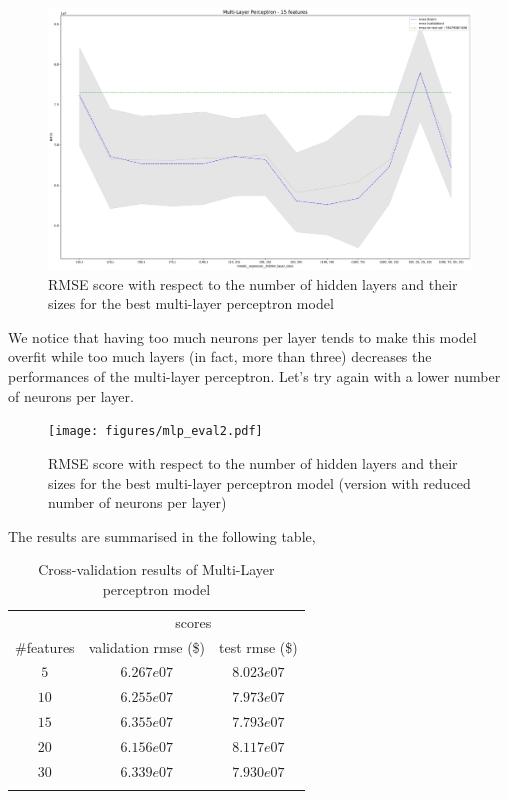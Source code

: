 \begin{figure}[H]
	\centering
	\includegraphics{figures/mlp_eval1.pdf}
	\caption{RMSE score with respect to the number of hidden layers and their sizes for the best multi-layer perceptron model}
	\label{fig:mlp_eval1}
\end{figure}

We notice that having too much neurons per layer tends to make this model overfit while too much layers (in fact, more than three) decreases the performances of the multi-layer perceptron. Let's try again with a lower number of neurons per layer.

\begin{figure}[H]
	\centering
	\texttt{[image: figures/mlp\_eval2.pdf]}
	\caption{RMSE score with respect to the number of hidden layers and their sizes for the best multi-layer perceptron model (version with reduced number of neurons per layer)}
	\label{fig:mlp_eval2}
\end{figure}

The results are summarised in the following table,
\begin{table}[H]
	\centering
	\begin{tabular}{ccc} \toprule
	  & \multicolumn {2}{c}{scores} \\\cmidrule(lr) {2-3}
	  \#features         & validation rmse (\$)             & test rmse (\$) \\\hline
	  $5$        		& $6.267e07	$                      	& $8.023e07$ \\
	  $10$        		& $6.255e07$                        & $7.973e07$ \\
	  $15$        		& $6.355e07$                        & $7.793e07$ \\
	  $20$             	& $6.156e07$                        & $8.117e07$ \\
	  $30$             	& $6.339e07$                        & $7.930e07$ \\
	  \\\hline
	\end{tabular}
	\caption{Cross-validation results of Multi-Layer perceptron model}
	\label{tab:mlp-results}
\end{table}

